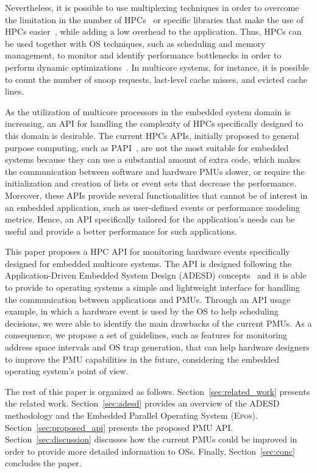 \documentclass[conference]{IEEEtran}
\begin{document}
Nevertheless, it is possible to use multiplexing techniques in order to overcome the limitation in the number of HPCs~\cite{May:01, Sprunt:02} or specific libraries that make the use of HPCs easier~\cite{Dongarra:2003}, while adding a low overhead to the application. Thus, HPCs can be used together with OS techniques, such as scheduling and memory management, to monitor and identify performance bottlenecks in order to perform dynamic optimizations~\cite{Azimi:2009}. In multicore systems, for instance, it is possible to count the number of snoop requests, last-level cache misses, and evicted cache lines. 

As the utilization of multicore processors in the embedded system domain is increasing, an API for handling the complexity of HPCs specifically designed to this domain is desirable. The current HPCs APIs, initially proposed to general purpose computing, such as PAPI~\cite{Dongarra:2003}, are not the most suitable for embedded systems because they can use a substantial amount of extra code, which makes the communication between software and hardware PMUs slower, or require the initialization and creation of lists or event sets that decrease the performance. Moreover, these APIs provide several functionalities that cannot be of interest in an embedded application, such as user-defined events or performance modeling metrics. Hence, an API specifically tailored for the application's needs can be useful and provide a better performance for such applications. 

This paper proposes a HPC API for monitoring hardware events specifically designed for embedded multicore systems. The API is designed following the Application-Driven Embedded System Design (ADESD) concepts~\cite{Froehlich:2001} and it is able to provide to operating systems a simple and lightweight interface for handling the communication between applications and PMUs. Through an API usage example, in which a hardware event is used by the OS to help scheduling decisions, we were able to identify the main drawbacks of the current PMUs. As a consequence, we propose a set of guidelines, such as features for monitoring address space intervals and OS trap generation, that can help hardware designers to improve the PMU capabilities in the future, considering the embedded operating system's point of view.

The rest of this paper is organized as follows. Section~\ref{sec:related_work} presents the related work. Section~\ref{sec:adesd} provides an overview of the ADESD methodology and the Embedded Parallel Operating System (\textsc{Epos}). Section~\ref{sec:proposed_api} presents the proposed PMU API. Section~\ref{sec:discussion} discusses how the current PMUs could be improved in order to provide more detailed information to OSs. Finally, Section~\ref{sec:conc} concludes the paper.
\end{document}
